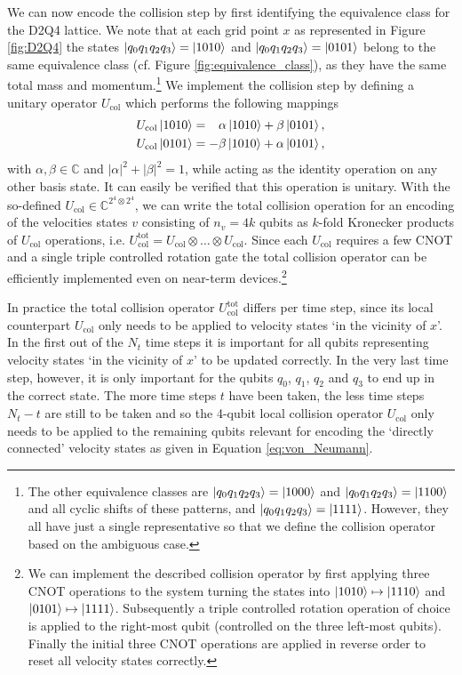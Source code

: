 We can now encode the collision step by first identifying the equivalence class for the D2Q4 lattice. We note that at each grid point $x$ as represented in Figure \ref{fig:D2Q4} the states $\ket{q_0q_1q_2q_3} = \ket{1010}$ and $\ket{q_0q_1q_2q_3} = \ket{0101}$ belong to the same equivalence class (cf. Figure \ref{fig:equivalence_class}), as they have the same total mass and momentum.\footnote{The other equivalence classes are $\ket{q_0q_1q_2q_3} = \ket{1000}$ and $\ket{q_0q_1q_2q_3} = \ket{1100}$ and all cyclic shifts of these patterns, and $\ket{q_0q_1q_2q_3} = \ket{1111}$. However, they all have just a single representative so that we define the collision operator based on the ambiguous case.} We implement the collision step by defining a unitary operator $U_\text{col}$ which performs the following mappings 
\begin{align}
    U_\text{col}\ket{1010} &= \phantom{-}\alpha\ket{1010} + \beta\ket{0101},\\
    U_\text{col}\ket{0101} &= -\beta\ket{1010} + \alpha\ket{0101},
\end{align} 
with $\alpha, \beta \in \mathbb{C}$ and $|\alpha|^2+|\beta|^2=1$,
while acting as the identity operation on any other basis state. It can easily be verified that this operation is unitary. With the so-defined $U_\text{col}\in \mathbb{C}^{2^4 \otimes 2^4}$, we can write the total collision operation for an encoding of the velocities states $v$ consisting of $n_v=4k$ qubits as $k$-fold Kronecker products of $U_\text{col}$ operations, i.e.  $U_\text{col}^\text{tot}=U_\text{col} \otimes \dots \otimes U_\text{col}$. Since each $U_\text{col}$ requires a few CNOT and a single triple controlled rotation gate the total collision operator can be efficiently implemented even on near-term devices.\footnote{We can implement the described collision operator by first applying three CNOT operations to the system turning the states into $\ket{1010} \mapsto \ket{1110}$ and $\ket{0101} \mapsto \ket{1111}$. Subsequently a triple controlled rotation operation of choice is applied to the right-most qubit (controlled on the three left-most qubits). Finally the initial three CNOT operations are applied in reverse order to reset all velocity states correctly.}

In practice the total collision operator $U_\text{col}^\text{tot}$ differs per time step, since its local counterpart $U_\text{col}$ only needs to be applied to velocity states `in the vicinity of $x$'. 
In the first out of the $N_t$ time steps it is important for all qubits representing velocity states `in the vicinity of $x$' to be updated correctly. In the very last time step, however, it is only important for the qubits $q_0$, $q_1$, $q_2$ and $q_3$ to end up in the correct state. The more time steps $t$ have been taken, the less time steps $N_t-t$ are still to be taken and so the 4-qubit local collision operator $U_\text{col}$ only needs to be applied to the remaining qubits relevant for encoding the `directly connected' velocity states as given in Equation \eqref{eq:von_Neumann}. 


